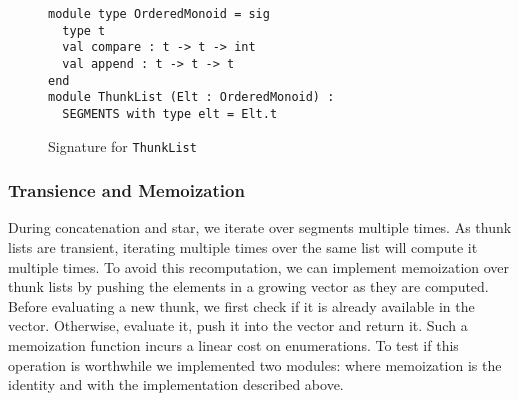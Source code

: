 
\begin{figure}[tp]
  \centering
\begin{lstlisting}
module type OrderedMonoid = sig
  type t
  val compare : t -> t -> int
  val append : t -> t -> t
end
module ThunkList (Elt : OrderedMonoid) :
  SEGMENTS with type elt = Elt.t
\end{lstlisting}
  \vspace{-\baselineskip}
  \caption{Signature for \texttt{ThunkList}}
  \label{code:thunklist}
\end{figure}

\subsubsection{Transience and Memoization}

During concatenation and star, we iterate over segments multiple times.
As thunk lists are transient, iterating multiple times over the same list
will compute it multiple times. To avoid this recomputation, we can implement memoization
over thunk lists by pushing the elements in a growing vector as they are
computed. Before evaluating a new thunk, we first check if it is already available
in the vector. Otherwise, evaluate it, push it into the vector and return it.
%
Such a memoization function incurs a linear cost on enumerations. To test
if this operation is worthwhile we implemented two modules:
 where memoization is the identity and 
with the implementation described above.

